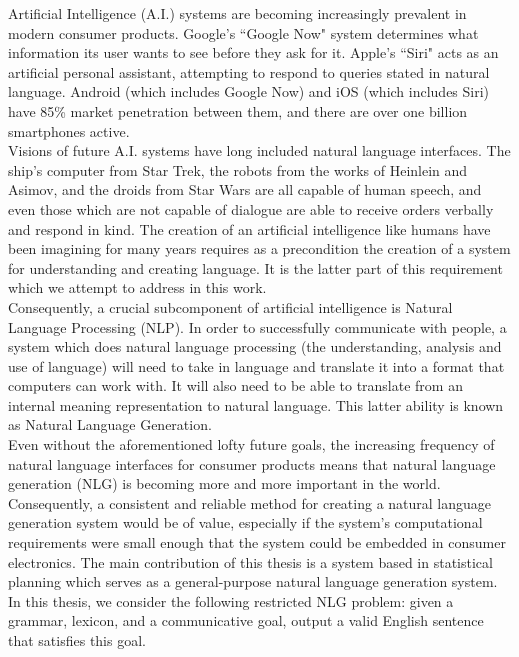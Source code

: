 Artificial Intelligence (A.I.) systems are becoming increasingly prevalent in
modern consumer products.  Google's ``Google Now" system determines
what information its user wants to see before they ask for it.  Apple's ``Siri"
acts as an artificial personal assistant, attempting to respond to queries stated in
natural language.  Android (which includes Google Now) and iOS (which
includes Siri) have 85\% market penetration between them, and there are
over one billion smartphones active.\\

Visions of future A.I. systems have long included natural
language interfaces.  The ship's computer from Star Trek, the robots from
the works of Heinlein and Asimov, and the droids from Star Wars are
all capable of human speech, and even those which are not capable of dialogue
are able to receive orders verbally and respond in kind.  The creation
of an artificial intelligence like humans have been imagining for many years
requires as a precondition the creation of a system for understanding and
creating language.  It is the latter part of this requirement which we attempt to 
address in this work.\\

Consequently, a crucial subcomponent of artificial intelligence is Natural Language Processing (NLP).
In order to successfully communicate with people, a system which does natural
language processing (the understanding, analysis and use of language) will need to
take in language and translate it into a format that computers can work with.  It will also
need to be able to translate from an internal meaning representation to natural language.
This latter ability is known as Natural Language Generation.\\

Even without the aforementioned lofty future goals, the increasing frequency of natural language interfaces for consumer
products means that natural language generation (NLG) is becoming more and more important
in the world.  Consequently, a consistent and reliable method for creating a natural
language generation system would be of value, especially if the system's
computational requirements were small enough that the system could be embedded
in consumer electronics.  The main contribution of this thesis is a system based in statistical
planning which serves as a general-purpose natural language generation system.\\

In this thesis, we consider the following restricted NLG problem: given a
grammar, lexicon, and a communicative goal, output a valid English
sentence that satisfies this goal.\\

